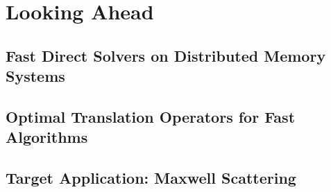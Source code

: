 \chapter{Looking Ahead}\label{chpt:3}


\section{Fast Direct Solvers on Distributed Memory Systems}\label{sec:3_2}


\section{Optimal Translation Operators for Fast Algorithms}\label{sec:3_3}


\section{Target Application: Maxwell Scattering}

